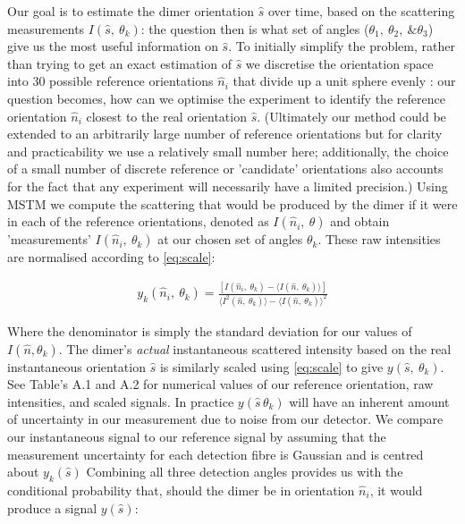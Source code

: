 \documentclass[final, 3p]{elsarticle}
\begin{document}
Our goal is to estimate the dimer orientation $\hat{s}$ over time, based on the scattering measurements  $I(\hat{s},\ \theta_k)$: the question then is what set of angles ($\theta_1,\ \theta_2,\ \& \theta_3$) give us the most useful information on $\hat{s}$. To initially simplify the problem, rather than trying to get an exact estimation of $\hat{s}$ we discretise the orientation space into 30 possible reference orientations $\hat{n}_i$ that divide up a unit sphere evenly \cite{Rey2006}: our question becomes, how can we optimise the experiment to identify the reference orientation $\hat{n}_i$ closest to the real orientation $\hat{s}$. (Ultimately our method could be extended to an arbitrarily large number of reference orientations but for clarity and practicability we use a relatively small number here; additionally, the choice of a small number of discrete reference or 'candidate' orientations also accounts for the fact that any experiment will necessarily have a limited precision.)   Using MSTM we compute the scattering that would be produced by the dimer if it were in each of the reference orientations, denoted as $I(\hat{n}_i, \ \theta)$ and obtain 'measurements'  $I(\hat{n}_i, \ \theta_k)$ at our chosen set of  angles $\theta_k$. These raw intensities are normalised according to \eqref{eq:scale}:

\begin{align}
	\label{eq:scale}
	y_k(\hat{n}_i,\ \theta_k) = 
	 \frac{\left[I(\hat{n}_i, \ \theta_k)- \langle I(\hat{n}, \ \theta_k) \rangle \right]} 
	{\langle I^2(\hat{n},\ \theta_k) \rangle -\langle I(\hat{n}, \ \theta_k)\rangle^2}
\end{align}

Where the denominator is simply the standard deviation for our values of $I(\hat{n}, \theta_k)$. The dimer's \emph{actual}  instantaneous scattered intensity based on the real instantaneous orientation $\hat{s}$  is similarly scaled using \eqref{eq:scale} to give $y(\hat{s},\ \theta_k)$. See Table's A.1 and A.2 for numerical values of our reference orientation, raw intensities, and scaled signals. In practice $y(\hat{s}\, \theta_k)$ will have an inherent amount of uncertainty in our measurement due to noise from our detector. We compare our instantaneous signal to our reference signal by assuming that the measurement uncertainty for each detection fibre is Gaussian and is centred about $y_k(\hat{s})$ Combining all three detection angles provides us with the conditional probability that, should the dimer be in orientation $\hat{n}_i$, it would produce a signal $y(\hat{s})$:
\end{document}
